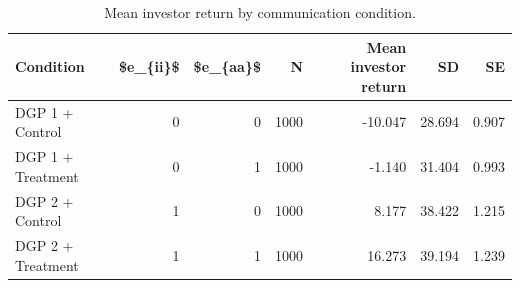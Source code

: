 \begin{table}

\caption{Mean investor return by communication condition.}
\centering
\begin{tabular}[t]{lrrrrrr}
\toprule
Condition & \$e\_\{ii\}\$ & \$e\_\{aa\}\$ & N & Mean investor return & SD & SE\\
\midrule
DGP 1 + Control & 0 & 0 & 1000 & -10.047 & 28.694 & 0.907\\
DGP 1 + Treatment & 0 & 1 & 1000 & -1.140 & 31.404 & 0.993\\
DGP 2 + Control & 1 & 0 & 1000 & 8.177 & 38.422 & 1.215\\
DGP 2 + Treatment & 1 & 1 & 1000 & 16.273 & 39.194 & 1.239\\
\bottomrule
\end{tabular}
\end{table}
